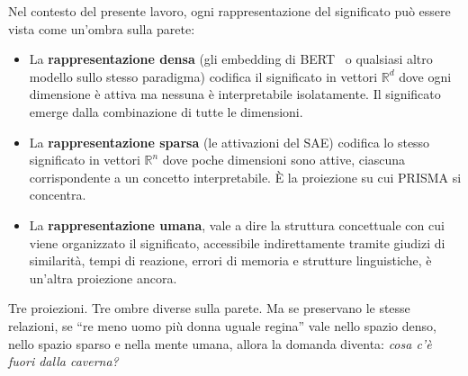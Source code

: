 Nel contesto del presente lavoro, ogni rappresentazione del significato può essere vista come un'ombra sulla parete:

\begin{itemize}
    \item La \textbf{rappresentazione densa} (gli embedding di BERT~\parencite{devlin2018bert} o qualsiasi altro modello sullo stesso paradigma) codifica il significato in vettori $\mathbb{R}^d$ dove ogni dimensione è attiva ma nessuna è interpretabile isolatamente. Il significato emerge dalla combinazione di tutte le dimensioni.
    \item La \textbf{rappresentazione sparsa} (le attivazioni del SAE) codifica lo stesso significato in vettori $\mathbb{R}^n$ dove poche dimensioni sono attive, ciascuna corrispondente a un concetto interpretabile. È la proiezione su cui PRISMA si concentra.
    \item La \textbf{rappresentazione umana}, vale a dire la struttura concettuale con cui viene organizzato il significato, accessibile indirettamente tramite giudizi di similarità, tempi di reazione, errori di memoria e strutture linguistiche, è un'altra proiezione ancora.
\end{itemize}

Tre proiezioni. Tre ombre diverse sulla parete. Ma se preservano le stesse relazioni, se ``re meno uomo più donna uguale regina'' vale nello spazio denso, nello spazio sparso e nella mente umana, allora la domanda diventa: \textit{cosa c'è fuori dalla caverna?}

